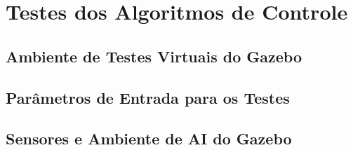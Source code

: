 

\section{Testes dos Algoritmos de Controle}

\subsection{Ambiente de Testes Virtuais do Gazebo}
\subsection{Parâmetros de Entrada para os Testes}
\subsection{Sensores e Ambiente de AI do Gazebo}